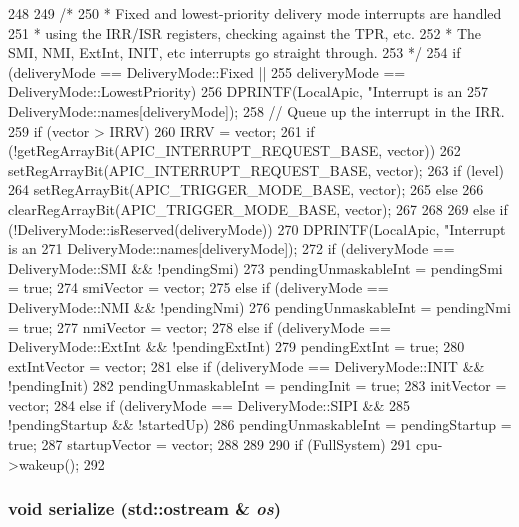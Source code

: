 \begin{DoxyCode}
248 {
249     /*
250      * Fixed and lowest-priority delivery mode interrupts are handled
251      * using the IRR/ISR registers, checking against the TPR, etc.
252      * The SMI, NMI, ExtInt, INIT, etc interrupts go straight through.
253      */
254     if (deliveryMode == DeliveryMode::Fixed ||
255             deliveryMode == DeliveryMode::LowestPriority) {
256         DPRINTF(LocalApic, "Interrupt is an %
257                 DeliveryMode::names[deliveryMode]);
258         // Queue up the interrupt in the IRR.
259         if (vector > IRRV)
260             IRRV = vector;
261         if (!getRegArrayBit(APIC_INTERRUPT_REQUEST_BASE, vector)) {
262             setRegArrayBit(APIC_INTERRUPT_REQUEST_BASE, vector);
263             if (level) {
264                 setRegArrayBit(APIC_TRIGGER_MODE_BASE, vector);
265             } else {
266                 clearRegArrayBit(APIC_TRIGGER_MODE_BASE, vector);
267             }
268         }
269     } else if (!DeliveryMode::isReserved(deliveryMode)) {
270         DPRINTF(LocalApic, "Interrupt is an %
271                 DeliveryMode::names[deliveryMode]);
272         if (deliveryMode == DeliveryMode::SMI && !pendingSmi) {
273             pendingUnmaskableInt = pendingSmi = true;
274             smiVector = vector;
275         } else if (deliveryMode == DeliveryMode::NMI && !pendingNmi) {
276             pendingUnmaskableInt = pendingNmi = true;
277             nmiVector = vector;
278         } else if (deliveryMode == DeliveryMode::ExtInt && !pendingExtInt) {
279             pendingExtInt = true;
280             extIntVector = vector;
281         } else if (deliveryMode == DeliveryMode::INIT && !pendingInit) {
282             pendingUnmaskableInt = pendingInit = true;
283             initVector = vector;
284         } else if (deliveryMode == DeliveryMode::SIPI &&
285                 !pendingStartup && !startedUp) {
286             pendingUnmaskableInt = pendingStartup = true;
287             startupVector = vector;
288         }
289     }
290     if (FullSystem)
291         cpu->wakeup();
292 }
\end{DoxyCode}
\hypertarget{classX86ISA_1_1Interrupts_a53e036786d17361be4c7320d39c99b84}{
\subsubsection[{serialize}]{\setlength{\rightskip}{0pt plus 5cm}void serialize (std::ostream \& {\em os})}}
\label{classX86ISA_1_1Interrupts_a53e036786d17361be4c7320d39c99b84}


